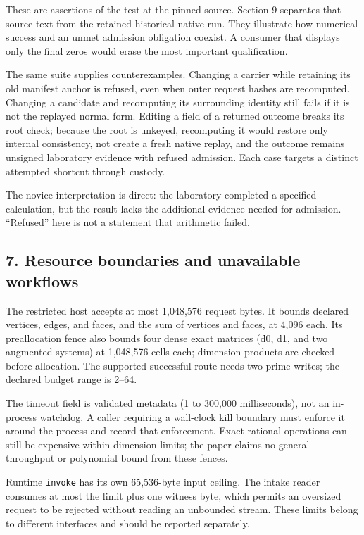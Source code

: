 \documentclass[
  11pt,
]{article}
\newcommand{\passthrough}[1]{#1}
\begin{document}
These are assertions of the test at the pinned source. Section 9
separates that source text from the retained historical native run. They
illustrate how numerical success and an unmet admission obligation
coexist. A consumer that displays only the final zeros would erase the
most important qualification.

The same suite supplies counterexamples. Changing a carrier while
retaining its old manifest anchor is refused, even when outer request
hashes are recomputed. Changing a candidate and recomputing its
surrounding identity still fails if it is not the replayed normal form.
Editing a field of a returned outcome breaks its root check; because the
root is unkeyed, recomputing it would restore only internal consistency,
not create a fresh native replay, and the outcome remains unsigned
laboratory evidence with refused admission. Each case targets a distinct
attempted shortcut through custody.

The novice interpretation is direct: the laboratory completed a
specified calculation, but the result lacks the additional evidence
needed for admission. ``Refused'' here is not a statement that
arithmetic failed.

\subsection{7. Resource boundaries and unavailable
workflows}\label{resource-boundaries-and-unavailable-workflows}

The restricted host accepts at most 1,048,576 request bytes. It bounds
declared vertices, edges, and faces, and the sum of vertices and faces,
at 4,096 each. Its preallocation fence also bounds four dense exact
matrices (d0, d1, and two augmented systems) at 1,048,576 cells each;
dimension products are checked before allocation. The supported
successful route needs two prime writes; the declared budget range is
2--64.

The timeout field is validated metadata (1 to 300,000 milliseconds), not
an in-process watchdog. A caller requiring a wall-clock kill boundary
must enforce it around the process and record that enforcement. Exact
rational operations can still be expensive within dimension limits; the
paper claims no general throughput or polynomial bound from these
fences.

Runtime \passthrough{\lstinline!invoke!} has its own 65,536-byte input
ceiling. The intake reader consumes at most the limit plus one witness
byte, which permits an oversized request to be rejected without reading
an unbounded stream. These limits belong to different interfaces and
should be reported separately.
\end{document}
